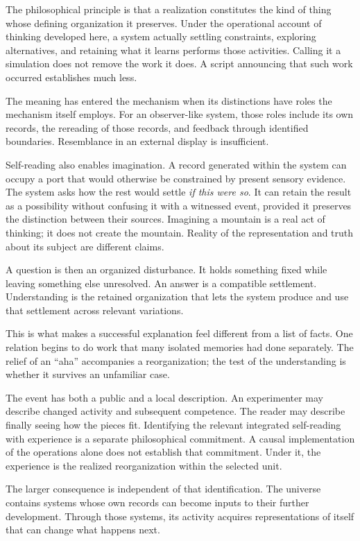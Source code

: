\documentclass[
  11pt,
]{article}
\begin{document}
The philosophical principle is that a realization constitutes the kind
of thing whose defining organization it preserves. Under the operational
account of thinking developed here, a system actually settling
constraints, exploring alternatives, and retaining what it learns
performs those activities. Calling it a simulation does not remove the
work it does. A script announcing that such work occurred establishes
much less.

The meaning has entered the mechanism when its distinctions have roles
the mechanism itself employs. For an observer-like system, those roles
include its own records, the rereading of those records, and feedback
through identified boundaries. Resemblance in an external display is
insufficient.

Self-reading also enables imagination. A record generated within the
system can occupy a port that would otherwise be constrained by present
sensory evidence. The system asks how the rest would settle \emph{if
this were so}. It can retain the result as a possibility without
confusing it with a witnessed event, provided it preserves the
distinction between their sources. Imagining a mountain is a real act of
thinking; it does not create the mountain. Reality of the representation
and truth about its subject are different claims.

A question is then an organized disturbance. It holds something fixed
while leaving something else unresolved. An answer is a compatible
settlement. Understanding is the retained organization that lets the
system produce and use that settlement across relevant variations.

This is what makes a successful explanation feel different from a list
of facts. One relation begins to do work that many isolated memories had
done separately. The relief of an ``aha'' accompanies a reorganization;
the test of the understanding is whether it survives an unfamiliar case.

The event has both a public and a local description. An experimenter may
describe changed activity and subsequent competence. The reader may
describe finally seeing how the pieces fit. Identifying the relevant
integrated self-reading with experience is a separate philosophical
commitment. A causal implementation of the operations alone does not
establish that commitment. Under it, the experience is the realized
reorganization within the selected unit.

The larger consequence is independent of that identification. The
universe contains systems whose own records can become inputs to their
further development. Through those systems, its activity acquires
representations of itself that can change what happens next.
\end{document}
